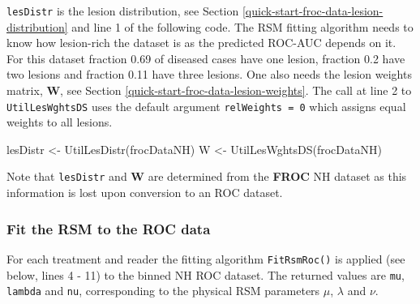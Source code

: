 \documentclass[
]{book}
\newenvironment{Shaded}{\begin{snugshade}}{\end{snugshade}}
\newcommand{\FunctionTok}[1]{\textcolor[rgb]{0.00,0.00,0.00}{#1}}
\newcommand{\NormalTok}[1]{#1}
\newcommand{\OtherTok}[1]{\textcolor[rgb]{0.56,0.35,0.01}{#1}}
\begin{document}
\texttt{lesDistr} is the lesion distribution, see Section \ref{quick-start-froc-data-lesion-distribution} and line 1 of the following code. The RSM fitting algorithm needs to know how lesion-rich the dataset is as the predicted ROC-AUC depends on it. For this dataset fraction 0.69 of diseased cases have one lesion, fraction 0.2 have two lesions and fraction 0.11 have three lesions. One also needs the lesion weights matrix, \(\textbf{W}\), see Section \ref{quick-start-froc-data-lesion-weights}. The call at line 2 to \texttt{UtilLesWghtsDS} uses the default argument \texttt{relWeights\ =\ 0} which assigns equal weights to all lesions.

\begin{Shaded}
\begin{Highlighting}[numbers=left,,]
\NormalTok{lesDistr }\OtherTok{\textless{}{-}} \FunctionTok{UtilLesDistr}\NormalTok{(frocDataNH)}
\NormalTok{W }\OtherTok{\textless{}{-}} \FunctionTok{UtilLesWghtsDS}\NormalTok{(frocDataNH)}
\end{Highlighting}
\end{Shaded}

Note that \texttt{lesDistr} and \(\textbf{W}\) are determined from the \textbf{FROC} NH dataset as this information is lost upon conversion to an ROC dataset.

\hypertarget{fit-the-rsm-to-the-roc-data}{%
\subsubsection{Fit the RSM to the ROC data}\label{fit-the-rsm-to-the-roc-data}}

For each treatment and reader the fitting algorithm \texttt{FitRsmRoc()} is applied (see below, lines 4 - 11) to the binned NH ROC dataset. The returned values are \texttt{mu}, \texttt{lambda} and \texttt{nu}, corresponding to the physical RSM parameters \(\mu\), \(\lambda\) and \(\nu\).
\end{document}
